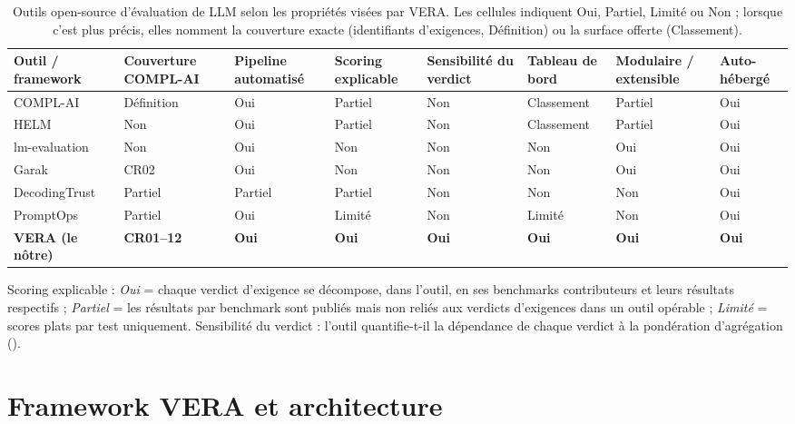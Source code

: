 \documentclass[10pt,conference]{IEEEtran}
\newcommand{\best}[1]{\textbf{#1}}
\newcommand{\tblsetup}{%
  \footnotesize%
  \setlength{\tabcolsep}{3pt}%
  \renewcommand{\arraystretch}{1.02}%
}
\begin{document}
\begin{table}[t]
  \caption{Outils open-source d'évaluation de LLM selon les propriétés visées par VERA. Les cellules indiquent Oui, Partiel, Limité ou Non ; lorsque c'est plus précis, elles nomment la couverture exacte (identifiants d'exigences, Définition) ou la surface offerte (Classement).}
  \label{tab:related-work}
  \centering
  \tblsetup
  \begin{tabularx}{\textwidth}{@{}l*{7}{>{\centering\arraybackslash}X}@{}}
    \toprule
    Outil / framework & Couverture COMPL-AI & Pipeline automatisé & Scoring explicable & Sensibilité du verdict & Tableau de bord & Modulaire / extensible & Auto-hébergé \\
    \midrule
    COMPL-AI~\cite{guldimann2024complai} & Définition & Oui & Partiel & Non & Classement & Partiel & Oui \\
    HELM~\cite{liang2023helm} & Non & Oui & Partiel & Non & Classement & Partiel & Oui \\
    lm-evaluation~\cite{gao2021lmevalharness} & Non & Oui & Non & Non & Non & Oui & Oui \\
    Garak~\cite{derczynski2024garak} & CR02 & Oui & Non & Non & Non & Oui & Oui \\
    DecodingTrust~\cite{wang2023decodingtrust} & Partiel & Partiel & Partiel & Non & Non & Non & Oui \\
    PromptOps~\cite{sunetnanta2025promptops} & Partiel & Oui & Limité & Non & Limité & Non & Oui \\
    \best{VERA (le nôtre)} & \best{CR01--12} & \best{Oui} & \best{Oui} & \best{Oui} & \best{Oui} & \best{Oui} & \best{Oui} \\
    \bottomrule
  \end{tabularx}
  \footnotesize\par\smallskip
  Scoring explicable : \emph{Oui} = chaque verdict d'exigence se décompose, dans l'outil, en ses benchmarks contributeurs et leurs résultats respectifs ; \emph{Partiel} = les résultats par benchmark sont publiés mais non reliés aux verdicts d'exigences dans un outil opérable ; \emph{Limité} = scores plats par test uniquement.
  Sensibilité du verdict : l'outil quantifie-t-il la dépendance de chaque verdict à la pondération d'agrégation ().
\end{table}

\section{Framework VERA et architecture}
\label{sec:framework}
\end{document}
